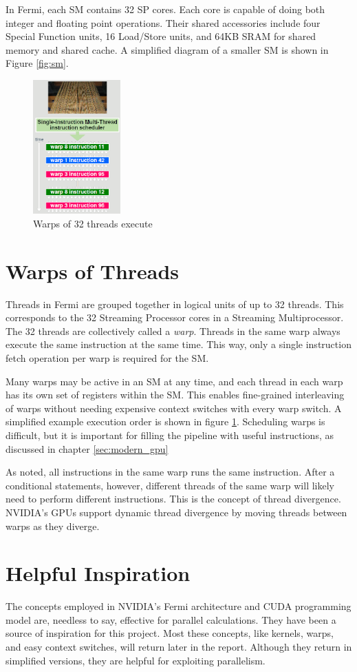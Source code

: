 \documentclass[../main/report.tex]{subfiles}
\begin{document}
In Fermi, each SM contains 32 SP cores. 
Each core is capable of doing both integer and floating point operations.
Their shared accessories include four Special Function units, 16 Load/Store units, and 64KB SRAM for shared memory and shared cache.
A simplified diagram of a smaller SM is shown in Figure \ref{fig:sm}.
\newpage
\begin{figure}[H]
\centering
\includegraphics[width=0.3\textwidth]{../introduction/assets/warp.png}
\caption{Warps of 32 threads execute }
\label{fig:simple-nvidia-warps}
\end{figure}

\section{Warps of Threads}

Threads in Fermi are grouped together in logical units of up to 32 threads.
This corresponds to the 32 Streaming Processor cores in a Streaming Multiprocessor.
The 32 threads are collectively called a \emph{warp}. 
Threads in the same warp always execute the same instruction at the same time.
This way, only a single instruction fetch operation per warp is required for the SM.

Many warps may be active in an SM at any time, and each thread in each warp has its own set of registers within the SM.
This enables fine-grained interleaving of warps without needing expensive context switches with every warp switch. 
A simplified example execution order is shown in figure \ref{fig:simple-nvidia-warps}.
Scheduling warps is difficult, but it is important for filling the pipeline with useful instructions, as discussed in chapter \ref{sec:modern_gpu}

As noted, all instructions in the same warp runs the same instruction.
After a conditional statements, however, different threads of the same warp will likely need to perform different instructions.
This is the concept of thread divergence.
NVIDIA's GPUs support dynamic thread divergence by moving threads between warps as they diverge.

\section{Helpful Inspiration}

The concepts employed in NVIDIA's Fermi architecture and CUDA programming model are, needless to say, effective for parallel calculations.
They have been a source of inspiration for this project.
Most these concepts, like kernels, warps, and easy context switches, will return later in the report.
Although they return in simplified versions, they are helpful for exploiting parallelism.
\end{document}
